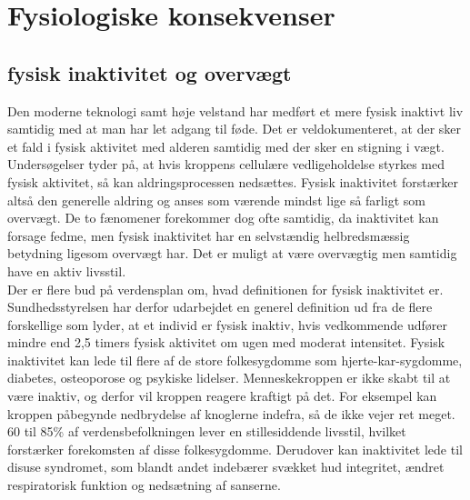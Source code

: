 \section{Fysiologiske konsekvenser}


\subsection{fysisk inaktivitet og overvægt}
Den moderne teknologi samt høje velstand har medført et mere fysisk inaktivt liv samtidig med at man har let adgang til føde\citep{Kiens2007}. Det er veldokumenteret, at der sker et fald i fysisk aktivitet med alderen samtidig med der sker en stigning i vægt\citep{Kaprio2008}. Undersøgelser tyder på, at hvis kroppens cellulære vedligeholdelse styrkes med fysisk aktivitet, så kan aldringsprocessen nedsættes\citep{Knight2012}. Fysisk inaktivitet forstærker altså den generelle aldring og anses som værende mindst lige så farligt som overvægt. De to fænomener forekommer dog ofte samtidig, da inaktivitet kan forsage fedme, men fysisk inaktivitet har en selvstændig helbredsmæssig betydning ligesom overvægt har. Det er muligt at være overvægtig men samtidig have en aktiv livsstil.\citep{Kiens2007,Kaprio2008,Hjort1997}\\
Der er flere bud på verdensplan om, hvad definitionen for fysisk inaktivitet er. Sundhedsstyrelsen har derfor udarbejdet en generel definition ud fra de flere forskellige som lyder, at et individ er fysisk inaktiv, hvis vedkommende udfører mindre end 2,5 timers fysisk aktivitet om ugen med moderat intensitet.\citep{Kiens2007} Fysisk inaktivitet kan lede til flere af de store folkesygdomme som hjerte-kar-sygdomme, diabetes, osteoporose og psykiske lidelser. Menneskekroppen er ikke skabt til at være inaktiv, og derfor vil kroppen reagere kraftigt på det. For eksempel kan kroppen påbegynde nedbrydelse af knoglerne indefra, så de ikke vejer ret meget. 60 til 85\% af verdensbefolkningen lever en stillesiddende livsstil, hvilket forstærker forekomsten af disse folkesygdomme.\citep{Kiens2007,Reshma2002,Martini2012} Derudover kan inaktivitet lede til disuse syndromet, som blandt andet indebærer svækket hud integritet, ændret respiratorisk funktion og nedsætning af sanserne\citep{Knight2012,Mosby2009}. \\

